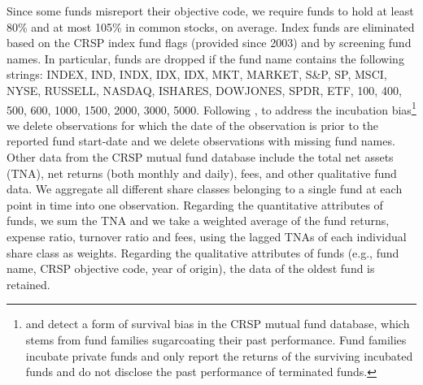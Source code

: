 \par Since some funds misreport their objective code, we require funds to hold at least 80\% and at most 105\% in common stocks, on average. Index funds are eliminated based on the CRSP index fund flags (provided since 2003) and by screening fund names. In particular, funds are dropped if the fund name contains the following strings: INDEX, IND, INDX, IDX, IDX, MKT, MARKET, S&P, SP, MSCI, NYSE, RUSSELL, NASDAQ, ISHARES, DOWJONES, SPDR, ETF, 100, 400, 500, 600, 1000, 1500, 2000, 3000, 5000. Following \citet{kacperczyk2008unobserved}, to address the incubation bias\footnote{\citet{evans2004does} and \citet{kacperczyk2008unobserved} detect a form of survival bias in the CRSP mutual fund database, which stems from fund families sugarcoating their past performance. Fund families incubate private funds and only report the returns of the surviving incubated funds and do not disclose the past performance of terminated funds.} we delete observations for which the date of the observation is prior to the reported fund start-date and we delete observations with missing fund names. Other data from the CRSP mutual fund database include the total net assets (TNA), net returns (both monthly and daily), fees, and other qualitative fund data. We aggregate all different share classes belonging to a single fund at each point in time into one observation. Regarding the quantitative attributes of funds, we sum the TNA and we take a weighted average of the fund returns, expense ratio, turnover ratio and fees, using the lagged TNAs of each individual share class as weights. Regarding the qualitative attributes of funds (e.g., fund name, CRSP objective code, year of origin), the data of the oldest fund is retained. 

